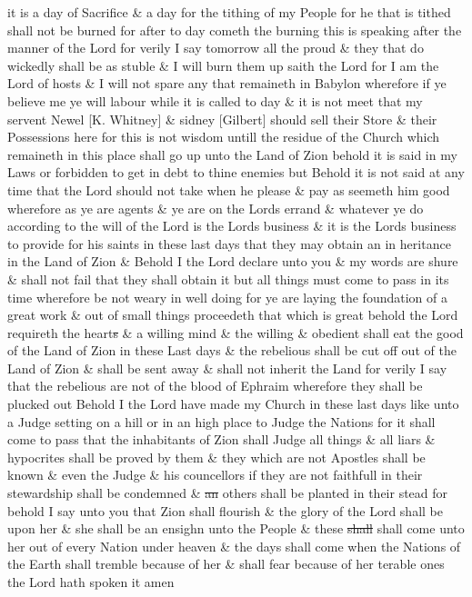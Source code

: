 {it is a day of Sacrifice \& a day for the tithing of my People for he that is tithed shall not be burned for after to day cometh the burning this is speaking after the manner of the Lord for verily I say tomorrow all the proud \& they that do wickedly shall be as stuble \& I will burn them up saith the Lord for I am the Lord of hosts \& I will not spare any that remaineth in Babylon wherefore if ye believe me ye will labour while it is called to day \& it is not meet that my servent Newel [K. Whitney] \& sidney [Gilbert] should sell their Store \& their Possessions here for this is not wisdom untill the residue of the Church which remaineth in this place shall go up unto the Land of Zion behold it is said in my Laws or forbidden to get in debt to thine enemies but Behold it is not said at any time that the Lord should not take when he please \& pay as seemeth him good wherefore as ye are agents \& ye are on the Lords errand \& whatever ye do according to the will of the Lord is the Lords business \& it is the Lords business to provide for his saints in these last days that they may obtain an in heritance in the Land of Zion \& Behold I the Lord declare unto you \& my words are shure \& shall not fail that they shall obtain it but all things must come to pass in its time wherefore be not weary in well doing for ye are laying the foundation of a great work \& out of small things proceedeth that which is great behold the Lord requireth the heart\sout{s} \& a willing mind \& the willing \& obedient shall eat the good of the Land of Zion in these Last days \& the rebelious shall be cut off out of the Land of Zion \& shall be sent away \& shall not inherit the Land for verily I say that the rebelious are not of the blood of Ephraim wherefore they shall be plucked out Behold I the Lord have made my Church in these last days like unto a Judge setting on a hill or in an high place to Judge the Nations for it shall come to pass that the inhabitants of Zion shall Judge all things \& all liars \& hypocrites shall be proved by them \& they which are not Apostles shall be known \& even the Judge \& his councellors if they are not faithfull in their stewardship shall be condemned \& \sout{an} others shall be planted in their stead for behold I say unto you that Zion shall flourish \& the glory of the Lord shall be upon her \& she shall be an ensighn unto the People \& these \sout{shall} shall come unto her out of every Nation under heaven \& the days shall come when the Nations of the Earth shall tremble because of her \& shall fear because of her terable ones the Lord hath spoken it amen
				
}
